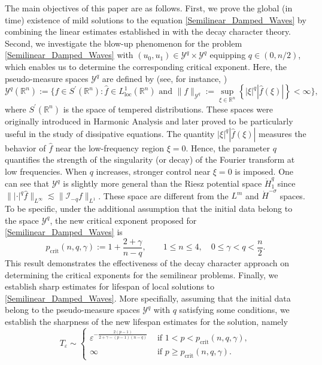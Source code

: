 \documentclass[11pt,reqno]{amsart}
\begin{document}
The main objectives of this paper are as follows. First, we prove the global (in time) existence of mild solutions to the equation \eqref{Semilinear_Damped_Waves} by combining the linear estimates established in \cite{Armando2022,ADL2024} with the decay character theory. Second, we investigate the blow-up phenomenon for the problem \eqref{Semilinear_Damped_Waves} with $(u_0,u_1)\in \mathcal{Y}^q\times \mathcal{Y}^q$ equipping $q \in (0, n/2)$, which enables us to determine the corresponding critical exponent. Here, the pseudo-measure spaces $\mathcal{Y}^q$ are defined by (see, for instance, \cite{Bhattacharya2003})
$$ 
\mathcal{Y}^q\left(\mathbb{R}^n\right):=\bigg\{f \in S^{\prime}\left(\mathbb{R}^n\right): \widehat{f} \in L_{\text{loc}}^1\left(\mathbb{R}^n\right) 
\text { and } \|f\|_{\mathcal{Y}^q} :=  \sup _{\xi \in \mathbb{R}^n}\left\{|\xi|^q|\widehat{f}(\xi)|\right\}<\infty\bigg\}, 
$$
where $S^{\prime}\left(\mathbb{R}^n\right)$ is the space of tempered distributions. These spaces were originally introduced in Harmonic Analysis and later proved to be particularly useful in the study of dissipative equations. The quantity
$|\xi|^q|\widehat{f}(\xi)|$ measures the behavior of $\widehat{f}$ near the low-frequency region $\xi = 0$. Hence, the parameter $q$ quantifies the strength of the singularity (or decay) of the Fourier transform at low frequencies. When $q$ increases, stronger control near $\xi=0$ is imposed. One can see that $\mathcal{Y}^q$ is slightly more general than the Riesz potential space $\dot{H}_1^{q}$ since $\||\cdot|^{q}\widehat{f}\|_{L^{\infty}}\lesssim \|\mathcal{I}_{-q}f\|_{L^1}$. These space are different from the $L^m$ and $\dot{H}^{-\sigma}$ spaces. To be specific, under the additional assumption that the initial data belong to the space $\mathcal{Y}^q$, the new critical exponent proposed for \eqref{Semilinear_Damped_Waves} is
\begin{equation}\label{Critical_Exp}
p_{\mathrm{crit}}(n,q,\gamma):=1+\frac{2+\gamma}{n-q}, \qquad 1\le n\le4,\quad 0\le\gamma<q<\frac{n}{2}.
\end{equation}
This result demonstrates the effectiveness of the decay character approach on determining the critical exponents for the semilinear problems. Finally, we establish sharp estimates for lifespan of local solutions to \eqref{Semilinear_Damped_Waves}.
More specifially, assuming that the initial data belong to the pseudo-measure spaces $\mathcal{Y}^q$ with $q$ satisfying some conditions, we establish the sharpness of the new lifespan estimates for the solution, namely
$$
T_{\varepsilon} \sim
\begin{cases}
\varepsilon^{-\frac{2(p-1)}{2+\gamma-(p-1)(n-q)}} & \text{ if } 1<p<p_{\mathrm{crit}}(n, q, \gamma),\\
\infty &\text{ if } p \geq p_{\mathrm{crit}}(n, q, \gamma).
\end{cases}
$$
\end{document}
